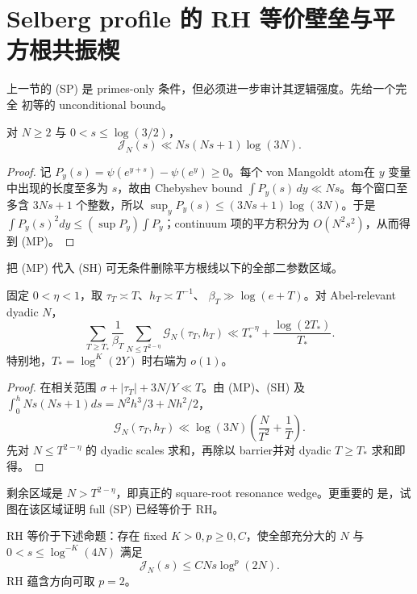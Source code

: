 \section{Selberg profile 的 RH 等价壁垒与平方根共振楔}

上一节的 (SP) 是 primes-only 条件，但必须进一步审计其逻辑强度。先给一个完全
初等的 unconditional bound。

\begin{theorem}
\label{thm:micro-prefix}
对 $N\geq2$ 与 $0<s\leq\log(3/2)$，
\[
 \mathcal J_N(s)\ll Ns(Ns+1)\log(3N).          \tag{MP}
\]
\end{theorem}

\begin{proof}
记 $P_y(s)=\psi(e^{y+s})-\psi(e^y)\geq0$。每个 von Mangoldt atom在
$y$ 变量中出现的长度至多为 $s$，故由 Chebyshev bound
$\int P_y(s)\,dy\ll Ns$。每个窗口至多含 $3Ns+1$ 个整数，所以
$\sup_yP_y(s)\leq(3Ns+1)\log(3N)$。于是
$\int P_y(s)^2dy\leq(\sup P_y)\int P_y$；continuum 项的平方积分为
$O(N^2s^2)$，从而得到 (MP)。
\end{proof}

把 (MP) 代入 (SH) 可无条件删除平方根线以下的全部二参数区域。

\begin{theorem}
\label{thm:wedge-evacuation}
固定 $0<\eta<1$，取 $\tau_T\asymp T$、$h_T\asymp T^{-1}$、
$\beta_T\gg\log(e+T)$。对 Abel-relevant dyadic $N$，
\[
 \sum_{T\geq T_*}\frac1{\beta_T}
 \sum_{N\leq T^{2-\eta}}\mathcal G_N(\tau_T,h_T)
 \ll T_*^{-\eta}+\frac{\log(2T_*)}{T_*}.       \tag{RW}
\]
特别地，$T_*=\log^K(2Y)$ 时右端为 $o(1)$。
\end{theorem}

\begin{proof}
在相关范围 $\sigma+|\tau_T|+3N/Y\ll T$。由 (MP)、(SH) 及
$\int_0^hNs(Ns+1)ds=N^2h^3/3+Nh^2/2$，
\[
 \mathcal G_N(\tau_T,h_T)
 \ll\log(3N)\left(\frac N{T^2}+\frac1T\right).
\]
先对 $N\leq T^{2-\eta}$ 的 dyadic scales 求和，再除以 barrier并对 dyadic
$T\geq T_*$ 求和即得。
\end{proof}

剩余区域是 $N>T^{2-\eta}$，即真正的 square-root resonance wedge。更重要的
是，试图在该区域证明 full (SP) 已经等价于 RH。

\begin{theorem}
\label{thm:profile-rh}
RH 等价于下述命题：存在 fixed $K>0,p\geq0,C$，使全部充分大的 $N$ 与
$0<s\leq\log^{-K}(4N)$ 满足
\[
 \mathcal J_N(s)\leq CNs\log^p(2N).             \tag{PE}
\]
RH 蕴含方向可取 $p=2$。
\end{theorem}

